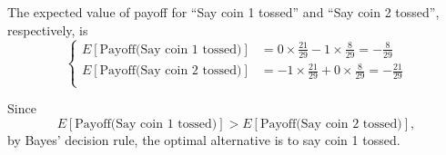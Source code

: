 \documentclass[a4paper]{article}
\begin{document}
\begin{enumerate}
\begin{enumerate}
\begin{solution}
  The expected value of payoff for ``Say coin 1 tossed'' and ``Say coin 2 tossed'', respectively, is
\begin{equation*}\left\{
\begin{aligned}
E[\text{Payoff(Say coin 1 tossed)}]&=0\times\frac{21}{29}-1\times\frac{8}{29}=-\frac{8}{29}\\
E[\text{Payoff(Say coin 2 tossed)}]&=-1\times\frac{21}{29}+0\times\frac{8}{29}=-\frac{21}{29}\\
\end{aligned}\right.
\end{equation*}

Since
$$
E[\text{Payoff(Say coin 1 tossed)}]>E[\text{Payoff(Say coin 2 tossed)}],
$$
by Bayes' decision rule, the optimal alternative is to say coin 1 tossed.
\end{solution}
\end{enumerate}

\end{enumerate}
%  

%  
  
\end{document}
